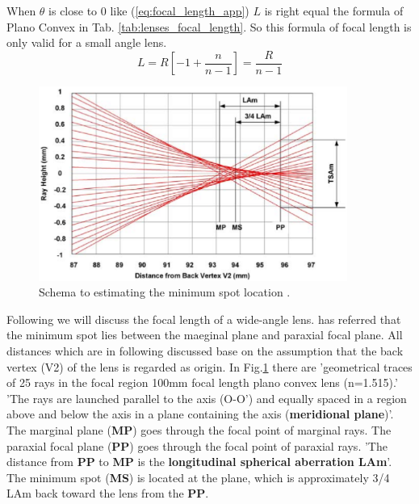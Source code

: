 When $\theta$ is close to 0 like (\ref{eq:focal_length_app}) $L$ is right equal the formula of Plano Convex in Tab. \ref{tab:lenses_focal_length}. So this formula of focal length is only valid for a small angle lens. 
\begin{equation}
L=R\left[ -1+\frac{n}{n-1}\right]=\frac{R}{n-1}
\label{eq:focal_length_app}
\end{equation}
\begin{figure}[!ht]
\centering
\includegraphics[width=0.9\textwidth]{bilder/min_max_spot}
\caption{Schema to estimating the minimum spot location \cite{lens_theory_LC_Ltd}.}
\label{fig:min_max_spot}
\end{figure}

Following we will discuss the focal length of a wide-angle lens. \cite{lens_theory_LC_Ltd} has referred that the minimum spot lies between the maeginal plane and paraxial focal plane. All distances which are in following discussed base on the assumption that the back vertex (V2) of the lens is regarded as origin. In Fig.\ref{fig:min_max_spot} there are 'geometrical traces of 25 rays in the focal region 100mm focal length plano convex lens (n=1.515).'  'The rays are launched parallel to the axis (O-O') and equally spaced in a region above and below the axis in a plane containing the axis (\textbf{meridional plane})'. The marginal plane (\textbf{MP}) goes through the focal point of marginal rays. The paraxial focal plane (\textbf{PP}) goes through the focal point of paraxial rays. 'The distance from \textbf{PP} to \textbf{MP} is the \textbf{longitudinal spherical aberration LAm}'. The minimum spot (\textbf{MS}) is located at the plane, which is approximately 3/4 LAm back toward the lens from the \textbf{PP}.\\